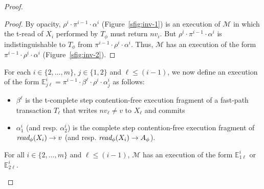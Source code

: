 \begin{proof}
\begin{proof}
By opacity, $\rho^i\cdot \pi^{i-1} \cdot \alpha^i$ (Figure~\ref{sfig:inv-1}) is an execution
of $\mathcal{M}$ in which the t-read of $X_i$ performed by $T_{\phi}$ must return $nv_i$.
But $\rho^i \cdot \pi^{i-1} \cdot \alpha^i$ is indistinguishable to $T_{\phi}$ from
$\pi^{i-1}\cdot \rho^i \cdot \alpha^i$.
Thus, $\mathcal{M}$ has an execution of the form $\pi^{i-1}\cdot \rho^i \cdot \alpha^i$ (Figure~\ref{sfig:inv-2}).
\end{proof}
%
For each $i\in \{2,\ldots, m\}$, $j\in \{1,2\}$ and $\ell \leq (i-1)$, 
we now define an execution of the form  $\mathbb{E}_{j\ell}^{i}=\pi^{i-1}\cdot \beta^{\ell}\cdot \rho^i \cdot \alpha_j^i$
as follows:
%
\begin{itemize}
\item
$\beta^{\ell}$ is the t-complete step contention-free execution fragment of a fast-path transaction $T_{\ell}$
that writes $nv_{\ell}\neq v$ to $X_{\ell}$ and commits
\item
$\alpha_1^i$ (and resp. $\alpha_2^i$) is the complete step contention-free execution fragment of 
$\textit{read}_{\phi}(X_i) \rightarrow v$ (and resp. $\textit{read}_{\phi}(X_i) \rightarrow A_{\phi}$).
\end{itemize}
%
\begin{claim}
\label{cl:ic2}
For all $i\in \{2,\ldots, m\}$ and $\ell \leq (i-1)$, $\mathcal{M}$ has an execution of the form $\mathbb{E}_{1\ell}^{i}$ or 
$\mathbb{E}_{2\ell}^{i}$.
\end{claim}
%
% 
% 

\end{proof}
